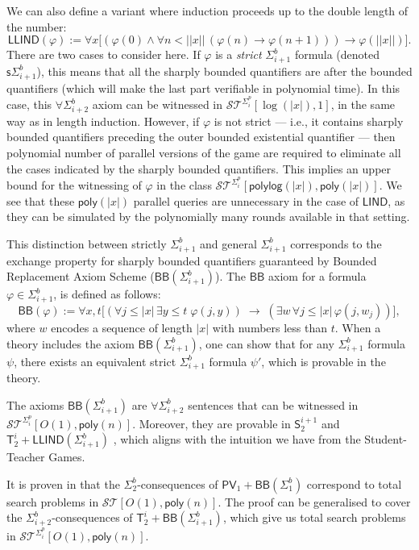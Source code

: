 \documentclass[11pt]{article}
\newcommand{\PV}{\mathsf{PV}}
\theoremstyle{definition}
\theoremstyle{definition}
\theoremstyle{remark}
\begin{document}
We can also define a variant where induction proceeds up to the double length of the number:
\[
\mathsf{LLIND}(\varphi) := 
\forall x \Big[(\varphi(0) \land \forall n < ||x|| \, (\varphi(n)\rightarrow \varphi(n+1))) \rightarrow \varphi(||x||)\Big].
\]
There are two cases to consider here. If $\varphi$ is a \emph{strict} $\Sigma^b_{i+1}$ formula (denoted $\mathsf{s}\Sigma^b_{i+1}$), this means that all the sharply bounded quantifiers are after the bounded quantifiers (which will make the last part verifiable in polynomial time). In this case, this $\forall\Sigma^b_{i+2}$ axiom can be witnessed in $\mathcal{ST}^{\Sigma^p_i}[\log(|x|),1]$, in the same way as in length induction. 
However, if $\varphi$ is not strict — i.e., it contains sharply bounded quantifiers preceding the outer bounded existential quantifier — then polynomial number of parallel versions of the game are required to eliminate all the cases indicated by the sharply bounded quantifiers. This implies an upper bound for the witnessing of $\varphi$ in the class $\mathcal{ST}^{\Sigma^p_i}[\mathsf{polylog}(|x|),\mathsf{poly}(|x|)]$. 
We see that these $\mathsf{poly}(|x|)$ parallel queries are unnecessary in the case of $\mathsf{LIND}$, as they can be simulated by the polynomially many rounds available in that setting.

This distinction between strictly $\Sigma^b_{i+1}$ and general $\Sigma^b_{i+1}$ corresponds to the exchange property for sharply bounded quantifiers  guaranteed by Bounded Replacement Axiom Scheme ($\mathsf{BB}(\Sigma^b_{i+1})$). 
The $\mathsf{BB}$ axiom for a formula $\varphi\in \Sigma^b_{i+1}$, is defined as follows:
\[
\mathsf{BB}(\varphi) := 
\forall x,t \Big[
(\forall j \leq |x| \, \exists y \leq t \; \varphi(j,y))
\;\rightarrow\;
(\exists w \, \forall j \leq |x| \, \varphi(j, w_j))
\Big],
\]
where $w$ encodes a sequence of length $|x|$ with numbers less than $t$. 
When a theory includes the axiom $\mathsf{BB}(\Sigma^b_{i+1})$, one can show that for any $\Sigma^b_{i+1}$ formula $\psi$, there exists an equivalent strict $\Sigma^b_{i+1}$ formula $\psi'$, which is provable in the theory.

The axioms $\mathsf{BB}(\Sigma^b_{i+1})$ are $\forall\Sigma^b_{i+2}$ sentences that can be witnessed in $\mathcal{ST}^{\Sigma^p_i}[O(1),\mathsf{poly}(n)]$. 
Moreover, they are provable in $\mathsf{S}^{i+1}_2$ and $\mathsf{T}^i_2+\mathsf{LLIND}(\Sigma^b_{i+1})$ \cite{ALLEN19911}, which aligns with the intuition we have from the Student-Teacher Games.

It is proven in \cite{DBLP:journals/tocl/CookT06} that the $\Sigma^b_2$-consequences of $\PV_1+\mathsf{BB}(\Sigma^b_1)$ correspond to total search problems in $\mathcal{ST}[O(1),\mathsf{poly}(n)]$. The proof can be generalised to cover the $\Sigma^b_{i+2}$-consequences of $\mathsf{T}^i_2+\mathsf{BB}(\Sigma^b_{i+1})$, which give us total search problems in $\mathcal{ST}^{\Sigma^p_i}[O(1),\mathsf{poly}(n)]$.
\end{document}
